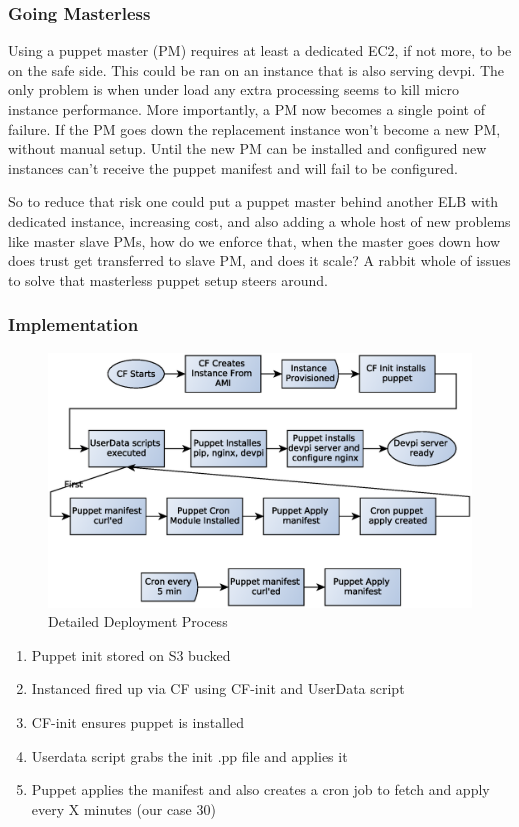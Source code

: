 \documentclass[12pt, letterpaper]{article}
\begin{document}
\subsubsection{Going Masterless}

Using a puppet master (PM) requires at least a dedicated EC2, if not more, to be on the safe side. This could be ran on an instance
that is also serving devpi. The only problem is when under load any extra processing seems to kill micro instance performance.
More importantly, a PM now becomes a single point of failure. If the PM goes down the replacement instance won't become a new PM,
without manual setup. Until the new PM can be installed and configured new instances can't receive the puppet manifest and will fail
to be configured. 

So to reduce that risk one could put a puppet master behind another ELB with dedicated instance, increasing cost, and also adding 
a whole host of new problems like master slave PMs, how do we enforce that, when the master goes down how does trust get 
transferred to slave PM, and does it scale? A rabbit whole of issues to solve that masterless puppet setup steers around.

\subsubsection{Implementation}

\begin{figure}[h]
    \caption{Detailed Deployment Process}
    \centering
    \includegraphics[width=\textwidth]{figures/base_setup.eps}
\end{figure}
\begin{enumerate}
    \item Puppet init stored on S3 bucked
    \item Instanced fired up via CF using CF-init and UserData script
    \item CF-init ensures puppet is installed
    \item Userdata script grabs the init .pp file and applies it
    \item Puppet applies the manifest and also creates a cron job to fetch and apply every X minutes (our case 30) 
\end{enumerate}
\end{document}
